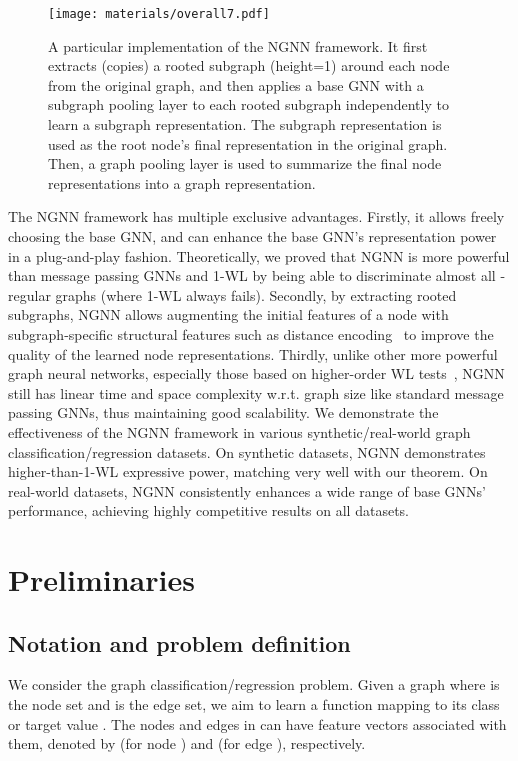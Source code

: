 \documentclass{article}
\begin{document}
\begin{figure*}[t]
\centering
\texttt{[image: materials/overall7.pdf]}
\caption{A particular implementation of the NGNN framework. It first extracts (copies) a rooted subgraph (height=1) around each node from the original graph, and then applies a base GNN with a subgraph pooling layer to each rooted subgraph independently to learn a subgraph representation. The subgraph representation is used as the root node's final representation in the original graph. Then, a graph pooling layer is used to summarize the final node representations into a graph representation.}
\label{fig:overall}
\end{figure*}



The NGNN framework has multiple exclusive advantages. Firstly, it allows freely choosing the base GNN, and can enhance the base GNN's representation power in a plug-and-play fashion. Theoretically, we proved that NGNN is more powerful than message passing GNNs and 1-WL by being able to discriminate almost all -regular graphs (where 1-WL always fails). Secondly, by extracting rooted subgraphs, NGNN allows augmenting the initial features of a node with subgraph-specific structural features such as distance encoding~\citep{li2020distance} to improve the quality of the learned node representations. Thirdly, unlike other more powerful graph neural networks, especially those based on higher-order WL tests~\citep{morris2019weisfeiler,maron2019provably,chen2019equivalence,morris2020weisfeiler}, NGNN still has linear time and space complexity w.r.t. graph size like standard message passing GNNs, thus maintaining good scalability. We demonstrate the effectiveness of the NGNN framework in various synthetic/real-world graph classification/regression datasets. On synthetic datasets, NGNN demonstrates higher-than-1-WL expressive power, matching very well with our theorem. On real-world datasets, NGNN consistently enhances a wide range of base GNNs' performance, achieving highly competitive results on all datasets. 







 



\section{Preliminaries}

\subsection{Notation and problem definition}
We consider the graph classification/regression problem. Given a graph  where  is the node set and  is the edge set, we aim to learn a function mapping  to its class or target value . The nodes and edges in  can have feature vectors associated with them, denoted by  (for node ) and  (for edge ), respectively.
\end{document}

